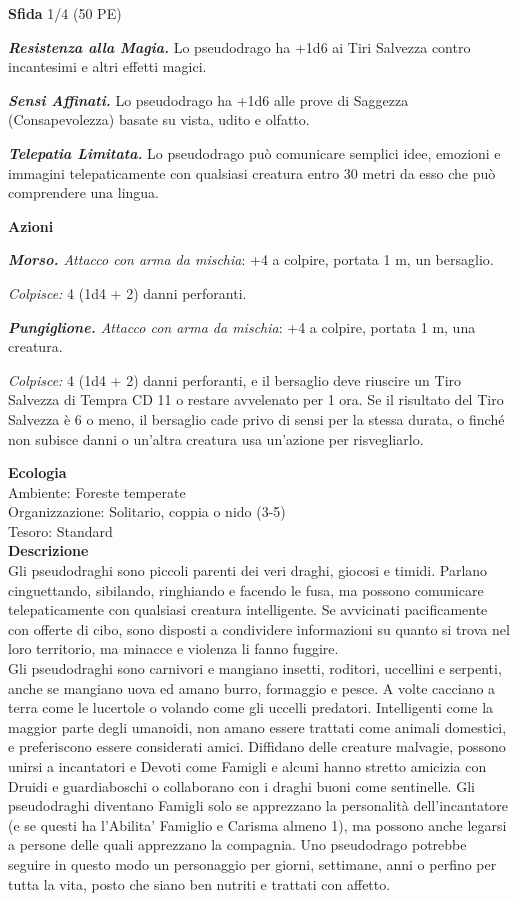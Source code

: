 \begin{multicols}{2}
\textbf{Sfida} 1/4 (50 PE)

\emph{\textbf{Resistenza alla Magia.}} Lo pseudodrago ha +1d6 ai Tiri Salvezza contro incantesimi e altri effetti magici.

\emph{\textbf{Sensi Affinati.}} Lo pseudodrago ha +1d6 alle prove di Saggezza (Consapevolezza) basate su vista, udito e olfatto.

\emph{\textbf{Telepatia Limitata.}} Lo pseudodrago può comunicare semplici idee, emozioni e immagini telepaticamente con qualsiasi creatura entro 30 metri da esso che può comprendere una lingua.

\textbf{Azioni}

\emph{\textbf{Morso.} Attacco con arma da mischia}: +4 a colpire,
portata 1 m, un bersaglio.

\emph{Colpisce:} 4 (1d4 + 2) danni perforanti.

\emph{\textbf{Pungiglione.} Attacco con arma da mischia}: +4 a colpire,
portata 1 m, una creatura.

\emph{Colpisce:} 4 (1d4 + 2) danni perforanti, e il bersaglio deve riuscire un Tiro Salvezza di Tempra CD 11 o restare avvelenato per 1 ora. Se il risultato del Tiro Salvezza è 6 o meno, il bersaglio cade privo di sensi per la stessa durata, o finché non subisce danni o un'altra creatura usa un'azione per risvegliarlo.

\textbf{Ecologia}\\
Ambiente: Foreste temperate\\
Organizzazione: Solitario, coppia o nido (3-5)\\
Tesoro: Standard\\
\textbf{Descrizione}\\
Gli pseudodraghi sono piccoli parenti dei veri draghi, giocosi e timidi. Parlano cinguettando, sibilando, ringhiando e facendo le fusa, ma possono comunicare telepaticamente con qualsiasi creatura intelligente. Se avvicinati pacificamente con offerte di cibo, sono disposti a condividere informazioni su quanto si trova nel loro territorio, ma minacce e violenza li fanno fuggire.\\

Gli pseudodraghi sono carnivori e mangiano insetti, roditori, uccellini e serpenti, anche se mangiano uova ed amano burro, formaggio e pesce. A volte cacciano a terra come le lucertole o volando come gli uccelli predatori. Intelligenti come la maggior parte degli umanoidi, non amano essere trattati come animali domestici, e preferiscono essere considerati amici. Diffidano delle creature malvagie, possono unirsi a incantatori e Devoti come Famigli e alcuni hanno stretto amicizia con Druidi e guardiaboschi o collaborano con i draghi buoni come sentinelle. Gli pseudodraghi diventano Famigli solo se apprezzano la personalità dell'incantatore (e se questi ha l'Abilita' Famiglio e Carisma almeno 1), ma possono anche legarsi a persone delle quali apprezzano la compagnia. Uno pseudodrago potrebbe seguire in questo modo un personaggio per giorni, settimane, anni o perfino per tutta la vita, posto che siano ben nutriti e trattati con affetto.\\


\end{multicols}
